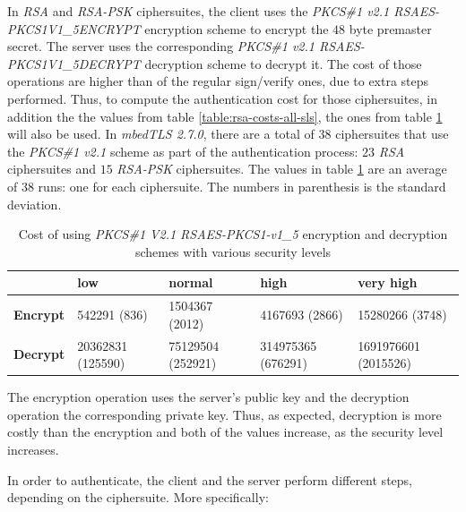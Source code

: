 \documentclass{llncs}
\begin{document}
In \textit{RSA} and \textit{RSA-PSK} ciphersuites, the client uses the \textit{PKCS\#1 v2.1 RSAES-PKCS1\-V1\_5\-ENCRYPT}\cite{RFC3447}
encryption scheme to encrypt  the $48$ byte premaster secret. The server uses the corresponding \textit{PKCS\#1 v2.1 RSAES-PKCS1\-V1\_5\-DECRYPT}\cite{RFC3447}
decryption scheme to decrypt it. The cost of those operations are higher than of the regular sign/verify ones, due to extra steps performed.
Thus, to compute the authentication cost for those ciphersuites, in addition the the values from table \ref{table:rsa-costs-all-sls}, the ones
from table \ref{table:pkcs-cost} will also be used. In \textit{mbedTLS 2.7.0}, there are a total of
$38$ ciphersuites that use the \textit{PKCS\#1 v2.1} scheme as part of the authentication process: $23$
\textit{RSA} ciphersuites and $15$ \textit{RSA-PSK} ciphersuites. The values in table \ref{table:pkcs-cost} are an average
of $38$ runs: one for each ciphersuite. The numbers in parenthesis is the standard deviation.

\begin{table}[]
  \begin{tabular}{|l|l|l|l|l|}
  \hline
                   & \textbf{low}      & \textbf{normal}   & \textbf{high}      & \textbf{very high}   \\ \hline
  \textbf{Encrypt} & 542291 (836)      & 1504367 (2012)    & 4167693 (2866)     & 15280266 (3748)      \\ \hline
  \textbf{Decrypt} & 20362831 (125590) & 75129504 (252921) & 314975365 (676291) & 1691976601 (2015526) \\ \hline
  \end{tabular}
  \centering \caption{\label{table:pkcs-cost} Cost of using \textit{PKCS\#1 V2.1 RSAES-PKCS1-v1\_5} encryption and decryption schemes with various security levels}
  \end{table}

The encryption operation uses the server's public key and the decryption operation the corresponding private key. Thus, as expected,
decryption is more costly than the encryption and both of the values increase, as the security level increases.

In order to authenticate, the client and the server perform different steps, depending on the ciphersuite. More specifically:
\end{document}
